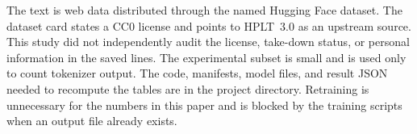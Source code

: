 \documentclass[10pt,twocolumn]{article}
\begin{document}
The text is web data distributed through the named Hugging Face dataset.
The dataset card states a CC0 license and points to HPLT~3.0 as an upstream source.
This study did not independently audit the license, take-down status, or personal information in the saved lines.
The experimental subset is small and is used only to count tokenizer output.
The code, manifests, model files, and result JSON needed to recompute the tables are in the project directory.
Retraining is unnecessary for the numbers in this paper and is blocked by the training scripts when an output file already exists.


\end{document}
